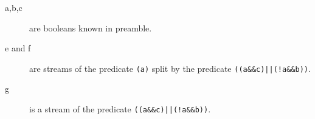 
\begin{description}
  \item[a,b,c] are booleans known in preamble.
  \item[e and f] are streams of the predicate \texttt{(a)} split by the predicate \texttt{((a\&\&c)||(!a\&\&b))}.
  \item[g] is a stream of the predicate \texttt{((a\&\&c)||(!a\&\&b))}.
\end{description}



